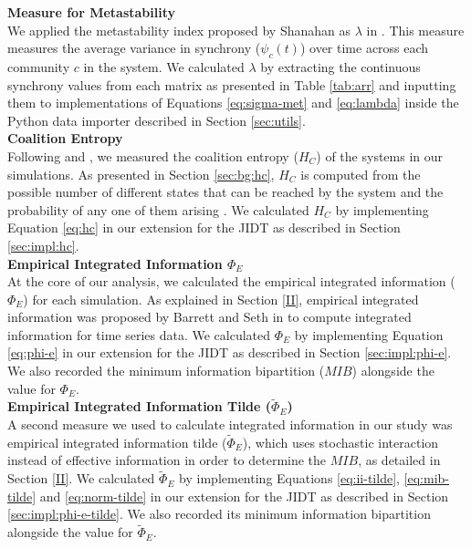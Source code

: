 \documentclass[a4paper,11pt]{article}
\begin{document}
\noindent \textbf{Measure for Metastability}\\
\noindent We applied the metastability index proposed by Shanahan as $\lambda$ in \cite{Shanahan2010}. This measure measures the average variance in synchrony ($\psi_c(t)$) over time across each community $c$ in the system. We calculated $\lambda$ by extracting the continuous synchrony values from each matrix as presented in Table \ref{tab:arr} and inputting them to implementations of Equations \ref{eq:sigma-met} and \ref{eq:lambda} inside the Python data importer described in Section \ref{sec:utils}.\\

\noindent \textbf{Coalition Entropy}\\
\noindent Following \cite{Shanahan2010} and \cite{Bhowmik2013}, we measured the coalition entropy ($H_C$) of the systems in our simulations. As presented in Section \ref{sec:bg:hc}, $H_C$ is computed from the possible number of different states that can be reached by the system and the probability of any one of them arising \cite{Bhowmik2013}. We calculated $H_{C}$ by implementing Equation \ref{eq:hc} in our extension for the JIDT as described in Section \ref{sec:impl:hc}.\\

\noindent \textbf{Empirical Integrated Information $\Phi_{E}$}\\
\noindent At the core of our analysis, we calculated the empirical integrated information ($\Phi_E$) for each simulation. As explained in Section \ref{II}, empirical integrated information was proposed by Barrett and Seth in \cite{Barrett2011} to compute integrated information for time series data. We calculated $\Phi_{E}$ by implementing Equation \ref{eq:phi-e} in our extension for the JIDT as described in Section \ref{sec:impl:phi-e}. We also recorded the minimum information bipartition ($MIB$) alongside the value for $\Phi_{E}$.\\

\noindent \textbf{Empirical Integrated Information Tilde ($\widetilde{\Phi}_{E}$)}\\
\noindent A second measure we used to calculate integrated information in our study was empirical integrated information tilde ($\widetilde{\Phi}_{E}$), which uses stochastic interaction instead of effective information in order to determine the $MIB$, as detailed in Section \ref{II}. We calculated $\widetilde{\Phi}_{E}$ by implementing Equations \ref{eq:ii-tilde},  \ref{eq:mib-tilde} and \ref{eq:norm-tilde} in our extension for the JIDT as described in Section \ref{sec:impl:phi-e-tilde}. We also recorded its minimum information bipartition alongside the value for $\widetilde{\Phi}_{E}$.\\
\end{document}
